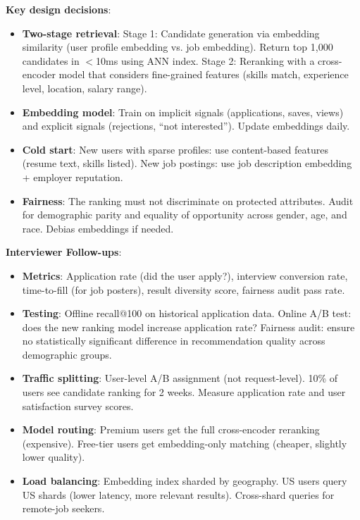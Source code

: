 \textbf{Key design decisions}:
\begin{itemize}[leftmargin=*]
    \item \textbf{Two-stage retrieval}: Stage 1: Candidate generation via embedding similarity (user profile embedding vs. job embedding). Return top 1,000 candidates in $<$10ms using ANN index. Stage 2: Reranking with a cross-encoder model that considers fine-grained features (skills match, experience level, location, salary range).
    \item \textbf{Embedding model}: Train on implicit signals (applications, saves, views) and explicit signals (rejections, ``not interested''). Update embeddings daily.
    \item \textbf{Cold start}: New users with sparse profiles: use content-based features (resume text, skills listed). New job postings: use job description embedding + employer reputation.
    \item \textbf{Fairness}: The ranking must not discriminate on protected attributes. Audit for demographic parity and equality of opportunity across gender, age, and race. Debias embeddings if needed.
\end{itemize}

\textbf{Interviewer Follow-ups}:
\begin{itemize}[leftmargin=*]
    \item \textbf{Metrics}: Application rate (did the user apply?), interview conversion rate, time-to-fill (for job posters), result diversity score, fairness audit pass rate.
    \item \textbf{Testing}: Offline recall@100 on historical application data. Online A/B test: does the new ranking model increase application rate? Fairness audit: ensure no statistically significant difference in recommendation quality across demographic groups.
    \item \textbf{Traffic splitting}: User-level A/B assignment (not request-level). 10\% of users see candidate ranking for 2 weeks. Measure application rate and user satisfaction survey scores.
    \item \textbf{Model routing}: Premium users get the full cross-encoder reranking (expensive). Free-tier users get embedding-only matching (cheaper, slightly lower quality).
    \item \textbf{Load balancing}: Embedding index sharded by geography. US users query US shards (lower latency, more relevant results). Cross-shard queries for remote-job seekers.
\end{itemize}

